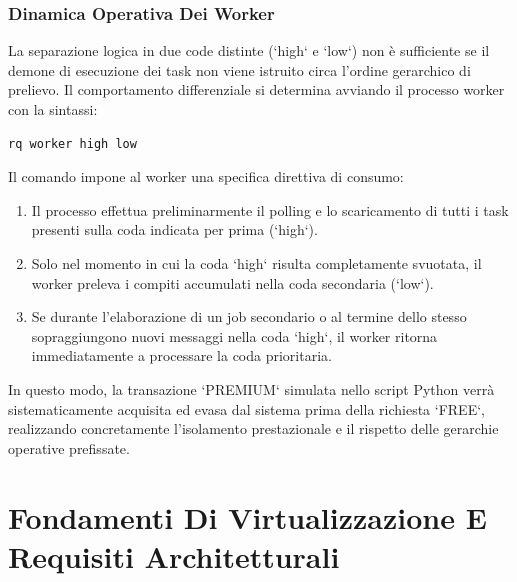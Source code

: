 \documentclass[11pt, a4paper]{article}
\begin{document}
\subsubsection{Dinamica Operativa Dei Worker}

La separazione logica in due code distinte (`high` e `low`) non è sufficiente se il demone di esecuzione dei task non viene istruito circa l'ordine gerarchico di prelievo. Il comportamento differenziale si determina avviando il processo worker con la sintassi:

\begin{lstlisting}[language=bash, caption={Avvio del processo worker con priorita' gerarchica}]
rq worker high low
\end{lstlisting}

Il comando impone al worker una specifica direttiva di consumo:
\begin{enumerate}
    \item Il processo effettua preliminarmente il polling e lo scaricamento di tutti i task presenti sulla coda indicata per prima (`high`).
    \item Solo nel momento in cui la coda `high` risulta completamente svuotata, il worker preleva i compiti accumulati nella coda secondaria (`low`).
    \item Se durante l'elaborazione di un job secondario o al termine dello stesso sopraggiungono nuovi messaggi nella coda `high`, il worker ritorna immediatamente a processare la coda prioritaria.
\end{enumerate}

In questo modo, la transazione `PREMIUM` simulata nello script Python verrà sistematicamente acquisita ed evasa dal sistema prima della richiesta `FREE`, realizzando concretamente l'isolamento prestazionale e il rispetto delle gerarchie operative prefissate.



\section{Fondamenti Di Virtualizzazione E Requisiti Architetturali}
\end{document}

